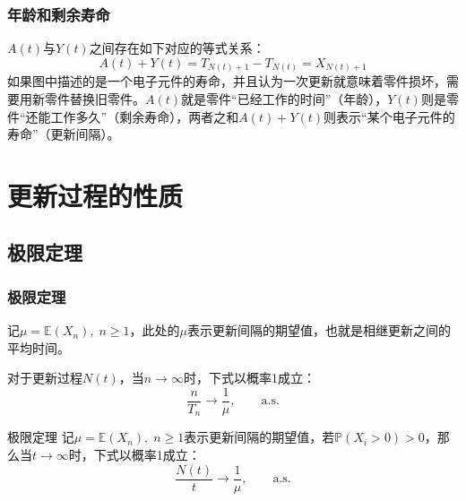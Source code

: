 \documentclass[t]{beamer}
\renewcommand{\Pr}{\mathbb{P}}
\newcommand{\E}{\mathbb{E}}
\begin{document}
\begin{frame}
  \frametitle{年龄和剩余寿命}

    $A(t)$与$Y(t)$之间存在如下对应的等式关系：
\[A(t)+Y(t)=T_{N(t)+1}-T_{N(t)}=X_{N(t)+1}\]
如果图中描述的是一个电子元件的寿命，并且认为一次更新就意味着零件损坏，需要用新零件替换旧零件。$A(t)$就是零件“已经工作的时间”（年龄），$Y(t)$则是零件“还能工作多久”（剩余寿命），两者之和$A(t)+Y(t)$则表示“某个电子元件的寿命”（更新间隔）。
\end{frame}



\section{更新过程的性质}

\subsection{极限定理}
\begin{frame}
  \frametitle{极限定理}
  记$\mu=\E(X_n),\; n\ge 1$，此处的$\mu$表示更新间隔的期望值，也就是相继更新之间的平均时间。
  
  对于更新过程$N(t)$，当$n\to\infty$时，下式以概率1成立：
  \begin{equation*}
      \frac{n}{T_n}\to\frac{1}{\mu},\qquad \text{a.s.}
  \end{equation*}
  
  \begin{block}{极限定理}
    记$\mu=\E(X_n),\; n\ge 1$表示更新间隔的期望值，若$\Pr(X_i>0)>0$，那么当$t\to\infty$时，下式以概率1成立：
\begin{equation*}
    \frac{N(t)}{t}\to\frac{1}{\mu},\qquad \text{a.s.}
\end{equation*}
\end{block}
\end{frame}
\end{document}
